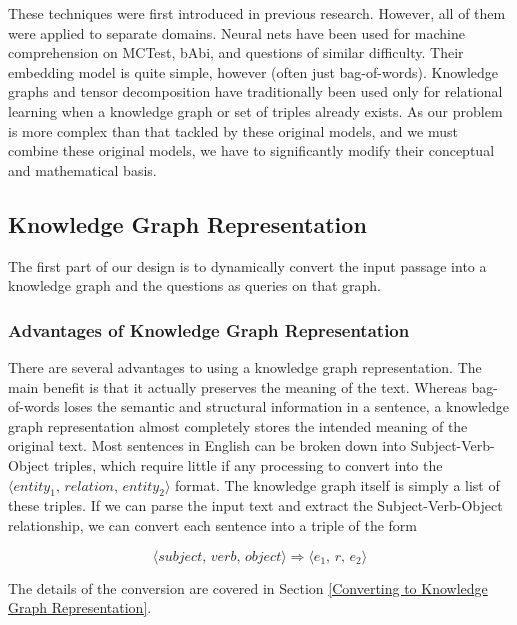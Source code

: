 \documentclass[pageno]{jpaper}
\begin{document}
These techniques were first introduced in previous research. However, all of
them were applied to separate domains. Neural nets have been used for machine
comprehension on MCTest, bAbi, and questions of similar difficulty. Their
embedding model is quite simple, however (often just bag-of-words). Knowledge
graphs and tensor decomposition have traditionally been used only for relational
learning when a knowledge graph or set of triples already exists. As our problem
is more complex than that tackled by these original models, and we must combine
these original models, we have to significantly modify their conceptual and
mathematical basis.

\subsection{Knowledge Graph Representation}
\label{Knowledge Graph Representation}

The first part of our design is to dynamically convert the input passage into a
knowledge graph and the questions as queries on that graph. \\

\subsubsection{Advantages of Knowledge Graph Representation}
\label{Advantages of Knowledge Graph Representation}

There are several advantages to using a knowledge graph representation. The main
benefit is that it actually preserves the meaning of the text. Whereas
bag-of-words loses the semantic and structural information in a sentence, a
knowledge graph representation almost completely stores the intended meaning of
the original text. Most sentences in English can be broken down into
Subject-Verb-Object triples, which require little if any processing to convert
into the $\langle \textit{entity}_1, \, \textit{relation}, \, \textit{entity}_2
\rangle$ format. The knowledge graph itself is simply a list of these triples.
If we can parse the input text and extract the Subject-Verb-Object relationship,
we can convert each sentence into a triple of the form

$$\langle \textit{subject}, \, \textit{verb}, \, \textit{object} \rangle
\Rightarrow \langle e_1, \, r, \, e_2 \rangle$$

The details of the conversion are covered in Section \ref{Converting to
Knowledge Graph Representation}.
\end{document}
